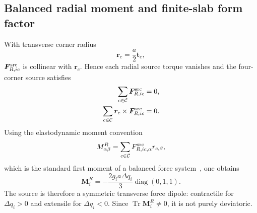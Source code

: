 \documentclass[10pt,aps,pre,reprint,floatfix,notitlepage,nofootinbib]{revtex4-2}
\newcommand{\vF}{\bm{F}}
\newcommand{\vrr}{\bm{r}}
\newcommand{\vt}{\bm{t}}
\newcommand{\Cc}{\mathcal C}
\begin{document}
\subsection{Balanced radial moment and finite-slab form factor}
\label{sec:s3-dipole-fourier}

With transverse corner radius
\begin{equation}
  \vrr_c=\frac{a}{2}\vt_c,
  \label{eq:s3-corner-radius}
\end{equation}
$\vF^{\rm src}_{R,ic}$ is collinear with $\vrr_c$.  Hence each radial source torque vanishes and the four-corner source satisfies
\begin{align}
  \sum_{c\in\Cc}\vF^{\rm src}_{R,ic}&=0,\\
  \sum_{c\in\Cc}\vrr_c\times\vF^{\rm src}_{R,ic}&=0.
  \label{eq:s3-radial-balance}
\end{align}
Using the elastodynamic moment convention
\begin{equation}
  M^R_{\alpha\beta}
  =\sum_{c\in\Cc}F^{\rm src}_{R,ic,\alpha}r_{c,\beta},
  \label{eq:s3-moment-definition}
\end{equation}
which is the standard first moment of a balanced force system~\cite{AkiRichards2002}, one obtains
\begin{equation}
  \bm M_i^R
  =-\frac{2g_i a\Delta q_i}{3}
  \operatorname{diag}(0,1,1).
  \label{eq:s3-radial-dipole}
\end{equation}
The source is therefore a symmetric transverse force dipole: contractile for $\Delta q_i>0$ and extensile for $\Delta q_i<0$.  Since $\operatorname{Tr}\bm M_i^R\ne0$, it is not purely deviatoric.
\end{document}

